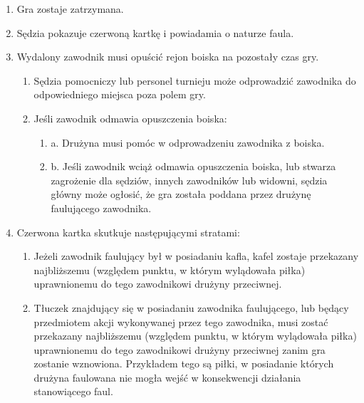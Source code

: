 \documentclass[12pt]{article}
\begin{document}
\begin{enumerate}
\item
    Gra zostaje zatrzymana.
  \item
    Sędzia pokazuje czerwoną kartkę i powiadamia o naturze faula.
  \item
    Wydalony zawodnik musi opuścić rejon boiska na pozostały czas gry.
  
  \begin{enumerate}
  \item
        Sędzia pomocniczy lub personel turnieju może odprowadzić zawodnika
    do odpowiedniego miejsca poza polem gry.
      \item
        Jeśli zawodnik odmawia opuszczenia boiska:
    
    \begin{enumerate}
    \item
            a. Drużyna musi pomóc w odprowadzeniu zawodnika z boiska.
          \item
            b. Jeśli zawodnik wciąż odmawia opuszczenia boiska, lub stwarza
      zagrożenie dla sędziów, innych zawodników lub widowni, sędzia
      główny może ogłosić, że gra została poddana przez drużynę
      faulującego zawodnika.
          \end{enumerate}
  \end{enumerate}
\item
    Czerwona kartka skutkuje następującymi stratami:
  
  \begin{enumerate}
  \item
        Jeżeli zawodnik faulujący był w posiadaniu kafla, kafel zostaje
    przekazany najbliższemu (względem punktu, w którym wylądowała piłka)
    uprawnionemu do tego zawodnikowi drużyny przeciwnej.
      \item
        Tłuczek znajdujący się w posiadaniu zawodnika faulującego, lub
    będący przedmiotem akcji wykonywanej przez tego zawodnika, musi
    zostać przekazany najbliższemu (względem punktu, w którym wylądowała
    piłka) uprawnionemu do tego zawodnikowi drużyny przeciwnej zanim gra
    zostanie wznowiona. Przykładem tego są piłki, w posiadanie których
    drużyna faulowana nie mogła wejść w konsekwencji działania
    stanowiącego faul.
    

\end{enumerate}
\end{enumerate}
\end{document}
